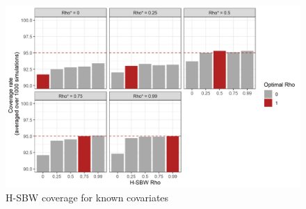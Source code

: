 \begin{figure}[H]
\begin{center}
    \caption{H-SBW coverage for known covariates}\label{fig:hsbwcoveragex}
    \includegraphics[scale=0.5]{01_Plots/coverage-x-plot.png}
\end{center}
\end{figure}

